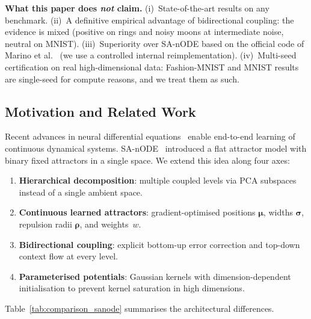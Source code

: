 \documentclass[11pt,a4paper]{article}
\begin{document}
\textbf{What this paper does \emph{not} claim.} (i)~State-of-the-art results on any
benchmark. (ii)~A definitive empirical advantage of bidirectional coupling: the evidence
is mixed (positive on rings and noisy moons at intermediate noise, neutral on MNIST).
(iii)~Superiority over SA-nODE based on the official code of Marino et al.~\cite{marino2024}
(we use a controlled internal reimplementation). (iv)~Multi-seed certification on real
high-dimensional data: Fashion-MNIST and MNIST results are single-seed for compute
reasons, and we treat them as such.

\subsection{Motivation and Related Work}

Recent advances in neural differential equations~\cite{chen2018neural} enable end-to-end
learning of continuous dynamical systems. SA-nODE~\cite{marino2024} introduced a flat
attractor model with binary fixed attractors in a single space. We extend this idea along
four axes:
\begin{enumerate}
  \item \textbf{Hierarchical decomposition}: multiple coupled levels via PCA subspaces
        instead of a single ambient space.
  \item \textbf{Continuous learned attractors}: gradient-optimised positions
        $\boldsymbol{\mu}$, widths $\boldsymbol{\sigma}$, repulsion radii
        $\boldsymbol{\rho}$, and weights~$w$.
  \item \textbf{Bidirectional coupling}: explicit bottom-up error correction and top-down
        context flow at every level.
  \item \textbf{Parameterised potentials}: Gaussian kernels with dimension-dependent
        initialisation to prevent kernel saturation in high dimensions.
\end{enumerate}

Table~\ref{tab:comparison_sanode} summarises the architectural differences.
\end{document}
